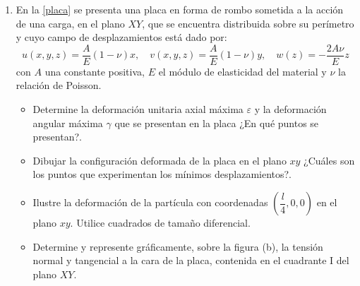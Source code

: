 \documentclass[../notas medios.tex]{subfiles}
\begin{document}
\begin{enumerate}
\item En la \cref{placa} se presenta una placa en forma de rombo sometida a la acción de una carga, en el plano $XY$, que se encuentra distribuida sobre su perímetro y cuyo campo de desplazamientos está dado por:
\[u \left(x,y,z \right) =  \dfrac{A}{E}  \left(1 - \nu \right) x,\quad
v \left(x,y,z \right) = \dfrac{A}{E}  \left(1 - \nu \right) y,\quad
w \left(z \right) = -\dfrac{2A \nu}{E} z\]
con $A$ una constante positiva, $E$  el módulo de elasticidad del material y $\nu$ la relación de Poisson.
\begin{figure}[h]
	\centering
	\hspace{2 cm}
\end{figure}

\begin{itemize}
	\item Determine la deformación unitaria axial máxima $\varepsilon$ y la deformación angular máxima $\gamma$ que se presentan en la placa ¿En qué puntos se presentan?.
	\item Dibujar la configuración deformada de la placa en el plano $xy$ ¿Cuáles son los puntos que experimentan los mínimos desplazamientos?.
	\item Ilustre la deformación de la partícula con coordenadas $\left( \dfrac{l}{4}, 0, 0 \right)$ en el plano $xy$. Utilice cuadrados de tamaño diferencial.
	\item Determine y represente gráficamente, sobre la figura (b), la tensión normal y tangencial a la cara de la placa, contenida en el cuadrante I del plano $XY$.
\end{itemize}

\end{enumerate}
\end{document}
